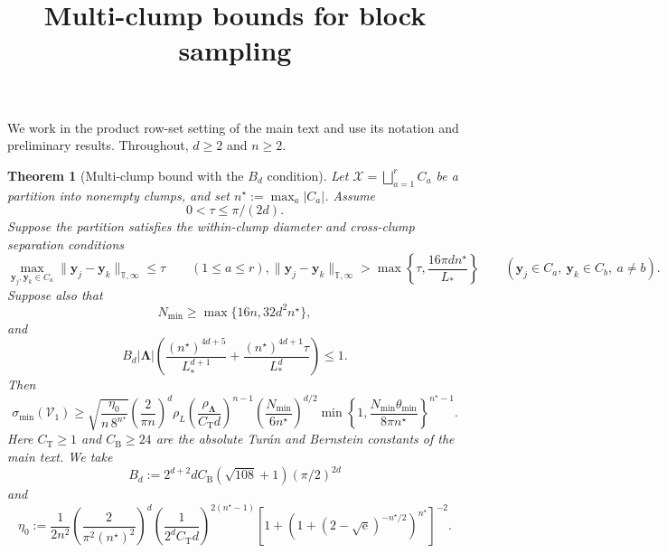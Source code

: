 \documentclass[11pt]{article}
\title{Multi-clump bounds for block sampling}
\author{}
\date{}
\newtheorem{theorem}{Theorem}
\newcommand{\V}{\mathcal V}
\newcommand{\X}{\mathcal X}
\newcommand{\T}{\mathbb T}
\begin{document}
\maketitle

We work in the product row-set setting of the main text and use its notation and preliminary results. Throughout, $d\ge2$ and $n\ge2$.

\begin{theorem}[Multi-clump bound with the $B_d$ condition]\label{thm:main}
Let $\X=\bigsqcup_{a=1}^r C_a$ be a partition into nonempty clumps, and set $n^\star:=\max_a|C_a|$. Assume
\begin{equation}\label{eq:geometry}
0<\tau\le\pi/(2d).
\end{equation}
Suppose the partition satisfies the within-clump diameter and cross-clump separation conditions
\begin{subequations}\label{eq:clump-definition}
\begin{equation}
\max_{\bm y_j,\bm y_k\in C_a}\|\bm y_j-\bm y_k\|_{\T,\infty}\le\tau\qquad(1\le a\le r),
\end{equation}
\begin{equation}
\|\bm y_j-\bm y_k\|_{\T,\infty}>\max\left\{\tau,\frac{16\pi dn^\star}{L_*}\right\}\qquad(\bm y_j\in C_a,\ \bm y_k\in C_b,\ a\ne b).
\end{equation}
\end{subequations}
Suppose also that
\begin{equation}\label{eq:aperture-gap}
N_{\min}\ge\max\{16n,32d^2n^\star\},
\end{equation}
and
\begin{equation}\label{eq:discretization}
B_d|\bm\Lambda|\left(\frac{(n^\star)^{4d+5}}{L_*^{d+1}}+\frac{(n^\star)^{4d+1}\tau}{L_*^d}\right)\le1.
\end{equation}
Then
\begin{equation}\label{eq:main}
\sigma_{\min}(\V_1)\ge\sqrt{\frac{\eta_0}{n\,8^{n^\star}}}\left(\frac{2}{\pi n}\right)^d\rho_L\left(\frac{\rho_{\bm\Lambda}}{C_{\mathrm T}d}\right)^{n-1}\left(\frac{N_{\min}}{6n^\star}\right)^{d/2}\min\left\{1,\frac{N_{\min}\theta_{\min}}{8\pi n^\star}\right\}^{n^\star-1}.
\end{equation}
Here $C_{\mathrm T}\ge1$ and $C_{\mathrm B}\ge24$ are the absolute Tur\'an and Bernstein constants of the main text. We take
\begin{equation}\label{eq:B-choice}
B_d:=2^{d+2}dC_{\mathrm B}(\sqrt{108}+1)(\pi/2)^{2d}
\end{equation}
and
\begin{equation}\label{eq:eta-choice}
\eta_0:=\frac{1}{2n^2}\left(\frac{2}{\pi^2(n^\star)^2}\right)^d\left(\frac{1}{2^dC_{\mathrm T}d}\right)^{2(n^\star-1)}\left[1+\left(1+(2-\sqrt{\mathrm e})^{-n^\star/2}\right)^{n^\star}\right]^{-2}.
\end{equation}
\end{theorem}
\end{document}

